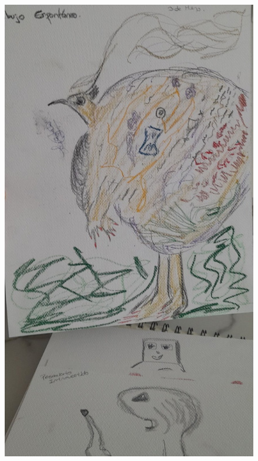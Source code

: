 \documentclass[12pt, a4paper, twoside]{book} %
\begin{document}
\begin{figure}[H]
	\centering
	\includegraphics[width=\textwidth]{./images/1f81324df3ff6b.jpg}
\end{figure}
\end{document}
